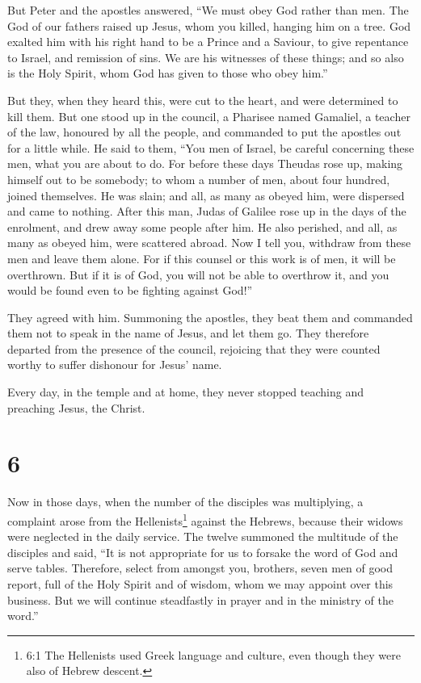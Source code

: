  But Peter and the apostles answered, ``We must obey God
rather than men.  The God of our fathers raised up Jesus,
whom you killed, hanging him on a tree.  God exalted him
with his right hand to be a Prince and a Saviour, to give repentance to
Israel, and remission of sins.  We are his witnesses of
these things; and so also is the Holy Spirit, whom God has given to
those who obey him.''

 But they, when they heard this, were cut to the heart, and
were determined to kill them.  But one stood up in the
council, a Pharisee named Gamaliel, a teacher of the law, honoured by
all the people, and commanded to put the apostles out for a little
while.  He said to them, ``You men of Israel, be careful
concerning these men, what you are about to do.  For before
these days Theudas rose up, making himself out to be somebody; to whom a
number of men, about four hundred, joined themselves. He was slain; and
all, as many as obeyed him, were dispersed and came to nothing.
 After this man, Judas of Galilee rose up in the days of
the enrolment, and drew away some people after him. He also perished,
and all, as many as obeyed him, were scattered abroad.  Now
I tell you, withdraw from these men and leave them alone. For if this
counsel or this work is of men, it will be overthrown.  But
if it is of God, you will not be able to overthrow it, and you would be
found even to be fighting against God!''

 They agreed with him. Summoning the apostles, they beat
them and commanded them not to speak in the name of Jesus, and let them
go.  They therefore departed from the presence of the
council, rejoicing that they were counted worthy to suffer dishonour for
Jesus' name.

 Every day, in the temple and at home, they never stopped
teaching and preaching Jesus, the Christ.

\hypertarget{section-5}{%
\section{6}\label{section-5}}

 Now in those days, when the number of the disciples was
multiplying, a complaint arose from the Hellenists\footnote{6:1 The
  Hellenists used Greek language and culture, even though they were also
  of Hebrew descent.} against the Hebrews, because their widows were
neglected in the daily service.  The twelve summoned the
multitude of the disciples and said, ``It is not appropriate for us to
forsake the word of God and serve tables.  Therefore, select
from amongst you, brothers, seven men of good report, full of the Holy
Spirit and of wisdom, whom we may appoint over this business.
 But we will continue steadfastly in prayer and in the
ministry of the word.''

